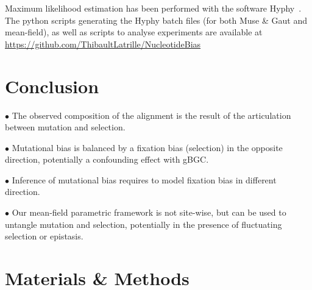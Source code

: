 Maximum \gls{likelihood} estimation has been performed with the software Hyphy~\citep{Pond2005}.
The python scripts generating the Hyphy batch files (for both Muse \& Gaut and mean-field), as well as scripts to analyse experiments are available at \url{https://github.com/ThibaultLatrille/NucleotideBias}

\section{Conclusion}

$\bullet$ The observed composition of the alignment is the result of the articulation between mutation and selection.

$\bullet$ Mutational bias is balanced by a fixation bias (selection) in the opposite direction, potentially a confounding effect with gBGC.

$\bullet$ Inference of mutational bias requires to model fixation bias in different direction.

$\bullet$ Our mean-field parametric framework is not site-wise, but can be used to untangle mutation and selection, potentially in the presence of fluctuating selection or epistasis.

\section{Materials \& Methods}


